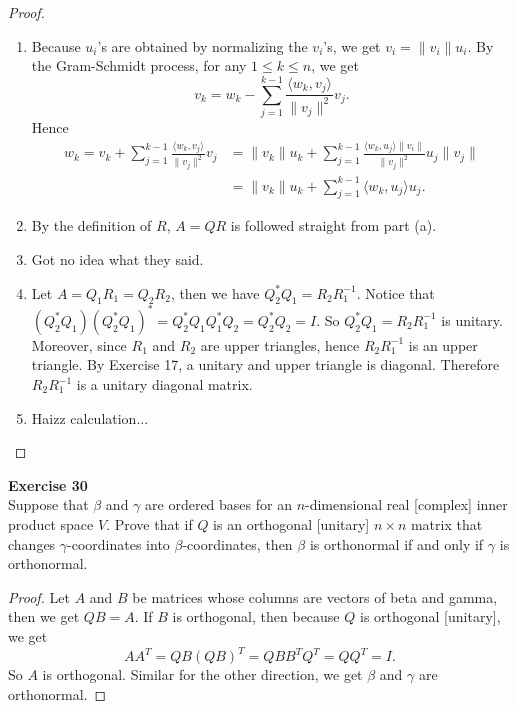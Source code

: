 \documentclass[12pt, a4paper]{article}
\theoremstyle{plain}
\newenvironment{exercise}[2][Exercise]
    { \begin{mdframed}[backgroundcolor=gray!20] \textbf{#1 #2} \\}
    {  \end{mdframed}}
\begin{document}
	\begin{proof}
	\hfill
	\begin{enumerate}[label=(\alph*)]
	\item Because $u_i$'s are obtained by normalizing the $v_i$'s, we get $v_i=\|v_i\|u_i$. By the Gram-Schmidt process, for any $1\leq k\leq n$, we get
	\[
	v_k = w_k -\sum_{j=1}^{k-1}{\frac{\langle{w_k,v_j}\rangle}{\|v_j\|^2}v_j}.
	\]
	Hence
	\begin{align*}
	w_k = v_k +\sum_{j=1}^{k-1}{\frac{\langle{w_k,v_j}\rangle}{\|v_j\|^2}v_j} &= \|v_k\|u_k+\sum_{j=1}^{k-1}{\frac{\langle{w_k,u_j}\rangle\|v_i\|}{\|v_j\|^2}u_j\|v_j\|}\\
	&=\|v_k\|u_k+\sum_{j=1}^{k-1}{\langle{w_k,u_j}\rangle u_j}.	
	\end{align*}
	\item By the definition of $R$, $A=QR$ is followed straight from part (a).
	\item Got no idea what they said.
	\item Let $A=Q_1R_1=Q_2R_2$, then we have $Q_2^*Q_1=R_2R_1^{-1}$. Notice that $(Q_2^*Q_1)(Q_2^*Q_1)^* = Q_2^*Q_1Q_1^*Q_2 = Q_2^*Q_2=I$. So $Q_2^*Q_1=R_2R_1^{-1}$ is unitary. Moreover, since $R_1$ and $R_2$ are upper triangles, hence $R_2R_1^{-1}$ is an upper triangle. By Exercise 17, a unitary and upper triangle is diagonal. Therefore $R_2R_1^{-1}$ is a unitary diagonal matrix.
	\item Haizz calculation...
	\end{enumerate}
	\end{proof}

\begin{exercise}{30}
Suppose that $\beta$ and $\gamma$ are ordered bases for an $n$-dimensional real [complex] inner product space $V$. Prove that if $Q$ is an orthogonal [unitary] $n\times n$ matrix that changes $\gamma$-coordinates into $\beta$-coordinates, then $\beta$ is orthonormal if and only if $\gamma$ is orthonormal. 
\end{exercise}
	\begin{proof}
	Let $A$ and $B$ be matrices whose columns are vectors of beta and gamma, then we get $QB = A$. If $B$ is orthogonal, then because $Q$ is orthogonal [unitary], we get
	\[
	AA^T = QB(QB)^T=QBB^TQ^T = QQ^T=I.
	\]
	So $A$ is orthogonal. Similar for the other direction, we get $\beta$ and $\gamma$ are orthonormal.
	\end{proof}
\end{document}
